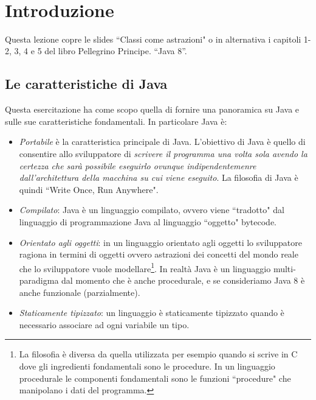 \documentclass{article}
\title{
\vspace{2in}
\textmd{\textbf{\hmwkClass\\ \vspace{1cm} \hmwkTitle \vspace{1cm}}}\\
\normalsize\vspace{0.1in}\small{\hmwkDueDate}\\
\vspace{0.1in}\large{\textit{\hmwkClassInstructor\ \hmwkClassTime}}
\vspace{3in}
}
\author{\textbf{\hmwkAuthorName}}
\date{} %
\theoremstyle{definition}
\begin{document}
\maketitle



\newpage
\tableofcontents
\newpage



\section{Introduzione}
Questa lezione copre le  slides ``Classi come astrazioni" o in alternativa i capitoli  1- 2, 3, 4 e 5 del libro  Pellegrino Principe. “Java 8”.


\subsection{Le caratteristiche di Java}
Questa esercitazione ha come scopo quella di fornire una panoramica su Java e sulle sue caratteristiche fondamentali. In particolare Java \`e:
\begin{itemize}
\item \emph{Portabile} \`e la caratteristica principale di Java. L'obiettivo di Java \`e quello di consentire allo sviluppatore di  \emph{scrivere il programma una volta sola avendo la certezza che sar\`a possibile eseguirlo ovunque indipendentemenre dall'architettura della macchina su cui viene eseguito}. La filosofia di Java \`e quindi ``Write Once, Run Anywhere".
\item \emph{Compilato}: Java \`e un linguaggio compilato, ovvero viene ``tradotto" dal linguaggio di programmazione Java al linguaggio ``oggetto" bytecode. 
\item \emph{Orientato agli oggetti}: in un linguaggio orientato agli oggetti lo sviluppatore ragiona in termini di oggetti ovvero astrazioni dei concetti del mondo reale che lo sviluppatore vuole modellare\footnote{La filosofia \`e diversa da quella utilizzata per esempio quando si scrive in C dove gli ingredienti fondamentali sono le procedure. In un linguaggio procedurale le componenti fondamentali sono le funzioni ``procedure" che manipolano i dati del programma.}. In realt\`a Java \`e un linguaggio multi-paradigma dal momento che \`e anche procedurale, e se consideriamo Java 8 \`e anche funzionale (parzialmente).
\item \emph{Staticamente tipizzato}: un linguaggio \`e staticamente tipizzato quando \`e necessario associare ad ogni variabile un tipo.
\end{itemize}
\end{document}

